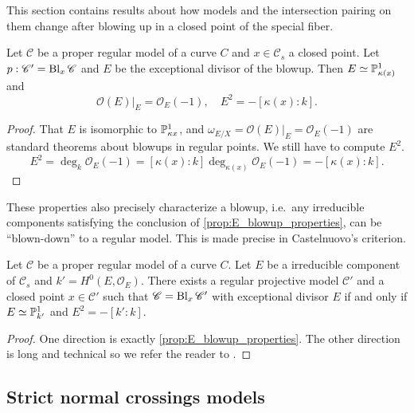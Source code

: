 This section contains results about how models and the intersection pairing on them change after blowing up in a closed point of the special fiber.  

\begin{proposition}\label{prop:E_blowup_properties}
	Let $\mathscr C$ be a proper regular model of a curve $C$ and $x \in \mathscr C_s$ a closed point. 
	Let $p: \mathscr C' = \operatorname{Bl}_x \mathscr C$ and $E$ be the exceptional divisor of the blowup. 
	Then $E \simeq \mathbb{P}^{1}_{\kappa(x)}$ and \[
		\mathcal{O}(E)|_E = \mathcal{O}_E(-1), \quad E^2 = -[\kappa (x): k]
	.\] 
\end{proposition}
\begin{proof}
	That $E$ is isomorphic to $\mathbb{P}^{1}_{\kappa x}$, and $\omega_{E / X} = \mathcal{O}(E)|_E = \mathcal{O}_E(-1)$ are standard theorems about blowups in regular points. 
	We still have to compute $E^2$. 
	\[
		E^2 = \deg_k \mathcal{O}_E(-1) = [\kappa(x): k] \deg_{\kappa (x)} \mathcal{O}_E(-1) = -[\kappa(x): k]
	.\] 
\end{proof}

These properties also precisely characterize a blowup, i.e.\ any irreducible components satisfying the conclusion of \cref{prop:E_blowup_properties}, can be ``blown-down'' to a regular model.
This is made precise in Castelnuovo's criterion. 

\begin{theorem}\label{thm:castelnuovo}
	Let $\mathscr C$ be a proper regular model of a curve $C$.
	Let $E$ be a irreducible component of $\mathscr C_s$ and $k' = H^{0}(E, \mathcal{O}_E)$. 
	There exists a regular projective model $\mathscr C'$ and a closed point $x \in \mathscr C'$ such that $\mathscr C = \operatorname{Bl}_x \mathscr C'$ with exceptional divisor $E$ if and only if $E \simeq \mathbb{P}_{k'}^{1}$ and $E^2 = -[k': k]$. 
\end{theorem}
\begin{proof}
	One direction is exactly \cref{prop:E_blowup_properties}. 
	The other direction is long and technical so we refer the reader to \cite[sec.\ 9.3.1]{liuAlgebraicGeometryArithmetic2002}.
\end{proof}

\subsection{Strict normal crossings models} \label{sec:strict_normal_crossings_models}

